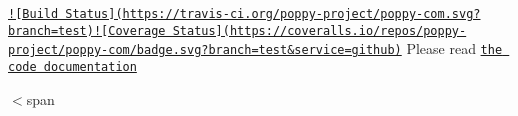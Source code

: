 \href{https://travis-ci.org/poppy-project/poppy-com}{\tt !\mbox{[}Build Status\mbox{]}(https\-://travis-\/ci.\-org/poppy-\/project/poppy-\/com.\-svg?branch=test)}\href{https://coveralls.io/github/poppy-project/poppy-com?branch=test}{\tt !\mbox{[}Coverage Status\mbox{]}(https\-://coveralls.\-io/repos/poppy-\/project/poppy-\/com/badge.\-svg?branch=test\&service=github)} Please read \href{http://poppy-project.github.io/poppy-com/}{\tt the code documentation}

$<$span 